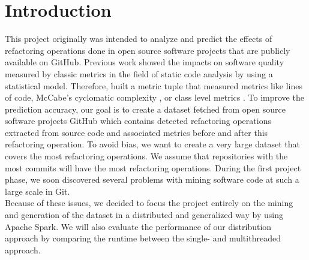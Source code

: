 \documentclass[conference]{IEEEtran}
\begin{document}
\section{Introduction}
This project originally was intended to analyze and predict the effects of refactoring operations done in open source software projects that are publicly available on GitHub. Previous work showed the impacts on software quality measured by classic metrics in the field of static code analysis \cite{Lin2019a} by using a statistical model. Therefore, \citeauthor{Lin2019a} built a metric tuple that measured metrics like lines of code, McCabe's cyclomatic complexity \cite{McCabe1976e}, or class level metrics \cite{Chidamber1994b}. To improve the prediction accuracy, our goal is to create a dataset fetched from open source software projects GitHub which contains detected refactoring operations extracted from source code and associated metrics before and after this refactoring operation. To avoid bias, we want to create a very large dataset that covers the most refactoring operations. We assume that repositories with the most commits will have the most refactoring operations. During the first project phase, we soon discovered several problems with mining software code at such a large scale in Git.\\
Because of these issues, we decided to focus the project entirely on the mining and generation of the dataset in a distributed and generalized way by using Apache Spark. We will also evaluate the performance of our distribution approach by comparing the runtime between the single- and multithreaded approach.
\end{document}
